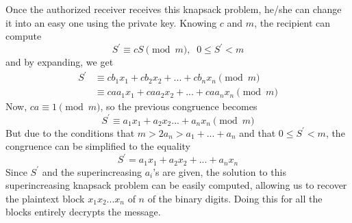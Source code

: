 \documentclass{article}
\begin{document}
Once the authorized receiver receives this knapsack problem, he/she can change it into an easy one using the private key. Knowing $c$ and $m$, the recipient can compute 
\begin{equation}
  S^\prime \equiv c S \pmod{m}, \;\; 0 \leq S^\prime < m
\end{equation}
and by expanding, we get
\begin{align*}
    S^\prime & \equiv c b_1 x_1 + c b_2 x_2 + ... + c b_n x_n \pmod{m} \\
    & \equiv c a a_1 x_1 + c a a_2 x_2 + ... + c a a_n x_n \pmod{m}
\end{align*}
Now, $ca \equiv 1 \pmod{m}$, so the previous congruence becomes 
\begin{equation}
  S^\prime \equiv a_1 x_1 + a_2 x_2... + a_n x_n \pmod{m}
\end{equation}
But due to the conditions that $m > 2a_n > a_1 + ... + a_n$ and that $0 \leq S^\prime < m$, the congruence can be simplified to the equality 
\begin{equation}
  S^\prime = a_1 x_1 + a_2 x_2 + ... + a_n x_n
\end{equation}
Since $S^\prime$ and the superincreasing $a_i$'s are given, the solution to this superincreasing knapsack problem can be easily computed, allowing us to recover the plaintext block $x_1 x_2 ... x_n$ of $n$ of the binary digits. Doing this for all the blocks entirely decrypts the message. 
\end{document}
